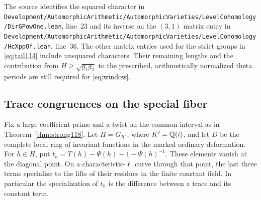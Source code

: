 \documentclass[a4paper,11pt]{article}
\theoremstyle{definition}
\theoremstyle{remark}
\newcommand{\srcloc}[2]{{\small\nolinkurl{#1.lean}}, line~#2}
\numberwithin{equation}{section}
\begin{document}
The source identifies the squared character in
\srcloc{Development/AutomorphicArithmetic/AutomorphicVarieties/LevelCohomology/DirGPowOne}{23}
and its inverse on the \((3,1)\) matrix entry in
\srcloc{Development/AutomorphicArithmetic/AutomorphicVarieties/LevelCohomology/HcXppOf}{36}.
The other matrix entries used for the strict groups in
\eqref{eq:tail114} include unsquared characters. Their remaining
lengths and the contribution from \(H\ge\sqrt{g_1g_2}\) to the
prescribed, arithmetically normalized theta periods are still
required for \eqref{eq:window}.

\subsection{Trace congruences on the special fiber}\label{nav:IV-29}
Fix a large coefficient prime and a twist on the common interval as in
Theorem~\ref{thm:strong118}. Let \(H=G_{K'}\), where \(K'=\mathbb Q(i)\),
and let \(D\) be the complete local ring of invariant functions in the
marked ordinary deformation. For \(h\in H\), put
\(t_h=T(h)-\Psi(h)-1-\Psi(h)^{-1}\). These elements vanish at the
diagonal point. On a characteristic-\(\ell\) curve through that point,
the last three terms specialize to the lifts of their residues in the
finite constant field. In particular the specialization of \(t_h\) is
the difference between a trace and its constant term.
\end{document}
